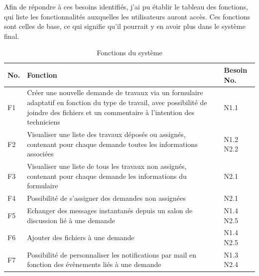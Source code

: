 \documentclass[
    iai, %
    eai, %
]{heig-tb}
\begin{document}
\newpage
Afin de répondre à ces besoins identifiés, j'ai pu établir le tableau des fonctions, qui liste les fonctionnalités auxquelles les utilisateurs auront accès.
Ces fonctions sont celles de base, ce qui signifie qu'il pourrait y en avoir plus dans le système final.

\begin{table}[h]
  \begin{center}
    \caption{Fonctions du système}
    \begin{tabularx}{\textwidth}[t]{p{0.5cm}Xp{1cm}}
      No. & Fonction                                                                                                                                                                                   & Besoin No.         \\ \toprule
      F1  & Créer une nouvelle demande de travaux via un formulaire adaptatif en fonction du type de travail, avec possibilité de joindre des fichiers et un commentaire à l'intention des techniciens & N1.1               \\ \midrule
      F2  & Visualiser une liste des travaux déposés ou assignés, contenant pour chaque demande toutes les informations associées                                                                      & N1.2 \newline N2.2 \\ \midrule
      F3  & Visualiser une liste de tous les travaux non assignés, contenant pour chaque demande les informations du formulaire                                                                        & N2.1               \\ \midrule
      F4  & Possibilité de s'assigner des demandes non assignées                                                                                                                                       & N2.1               \\ \midrule
      F5  & Echanger des messages instantanés depuis un salon de discussion lié à une demande                                                                                                          & N1.4 \newline N2.5 \\ \midrule
      F6  & Ajouter des fichiers à une demande                                                                                                                                                         & N1.4 \newline N2.5 \\ \midrule
      F7  & Possibilité de personnaliser les notifications par mail en fonction des évènements liés à une demande                                                                                      & N1.3 \newline N2.4 \\ \midrule

\end{tabularx}
\end{center}
\end{table}
\end{document}
